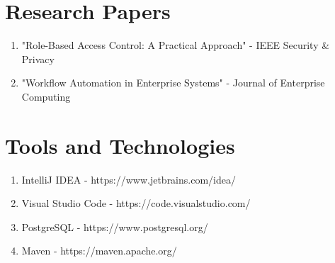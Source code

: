 \documentclass[12pt,a4paper,twoside]{book}
\begin{document}
\section{Research Papers}

\begin{enumerate}
    \item "Role-Based Access Control: A Practical Approach" - IEEE Security \& Privacy
    \item "Workflow Automation in Enterprise Systems" - Journal of Enterprise Computing
\end{enumerate}

\section{Tools and Technologies}

\begin{enumerate}
    \item IntelliJ IDEA - https://www.jetbrains.com/idea/
    \item Visual Studio Code - https://code.visualstudio.com/
    \item PostgreSQL - https://www.postgresql.org/
    \item Maven - https://maven.apache.org/
\end{enumerate}
\end{document}
